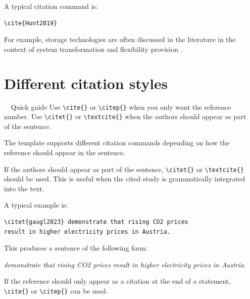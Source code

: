 \documentclass[11pt,a4paper]{report}
\begin{document}
A typical citation command is:

\begin{coloredBlock}[grey]{}
\begin{verbatim}
\cite{Hunt2019}
\end{verbatim}
\end{coloredBlock}

For example, storage technologies are often discussed in the literature in the context of system transformation and flexibility provision \citep{Hunt2019}.

\section{Different citation styles}

\begin{sideBlock}[green]{~~Quick guide}
Use \texttt{\textbackslash cite\{\}} or \texttt{\textbackslash citep\{\}} when you only want the reference number. Use \texttt{\textbackslash citet\{\}} or \texttt{\textbackslash textcite\{\}} when the authors should appear as part of the sentence.
\end{sideBlock}

The template supports different citation commands depending on how the reference should appear in the sentence.

If the authors should appear as part of the sentence, \texttt{\textbackslash citet\{\}} or \texttt{\textbackslash textcite\{\}} should be used. This is useful when the cited study is grammatically integrated into the text.

A typical example is:

\begin{coloredBlock}[grey]{}
\begin{verbatim}
\citet{gaugl2023} demonstrate that rising CO2 prices
result in higher electricity prices in Austria.
\end{verbatim}
\end{coloredBlock}

This produces a sentence of the following form:

\textit{\citet{gaugl2023} demonstrate that rising CO2 prices result in higher electricity prices in Austria.}

If the reference should only appear as a citation at the end of a statement, \texttt{\textbackslash cite\{\}} or \texttt{\textbackslash citep\{\}} can be used.

\newpage
\end{document}
